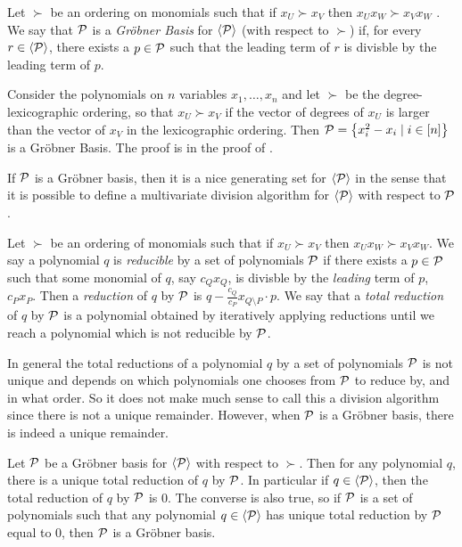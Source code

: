 \begin{definition}\label{def:grobner}
    Let $\succ$ be an ordering on monomials such that if $x_U \succ x_V$ then $x_Ux_W \succ x_Vx_W$ . We say that $\mathcal P$ is a \emph{Gr\"obner Basis} for $\langle \mathcal P \rangle$ (with respect to $\succ$) if, for every $r \in \langle \mathcal P \rangle$, there exists a $p \in \mathcal P$ such that the leading term of $r$ is divisble by the leading term of $p$.
\end{definition}
\begin{example}\label{ex:grobner}
Consider the polynomials on $n$ variables $x_1,\dots,x_n$ and let $\succ$ be the degree-lexicographic ordering, so that $x_U \succ x_V$ if the vector of degrees of $x_U$ is larger than the vector of $x_V$ in the lexicographic ordering. Then $\mathcal P = \left\{x_i^2 - x_i \mid i \in [n]\right\}$ is a Gr\"obner Basis. The proof is in the proof of .
\end{example}
If $\mathcal P$ is a Gr\"obner basis, then it is a nice generating set for $\langle \mathcal P \rangle$ in the sense that it is possible to define a multivariate division algorithm for $\langle \mathcal P \rangle$ with respect to $\mathcal P$.
\begin{definition}
Let $\succ$ be an ordering of monomials such that if $x_U \succ x_V$ then $x_Ux_W \succ x_Vx_W$. We say a polynomial $q$ is \emph{reducible} by a set of polynomials $\mathcal P$ if there exists a $p \in \mathcal P$ such that some monomial of $q$, say $c_Qx_Q$, is divisble by the \emph{leading} term of $p$, $c_Px_P$. Then a \emph{reduction} of $q$ by $\mathcal P$ is $q - \frac{c_Q}{c_P}x_{Q \setminus P} \cdot p$. We say that a \emph{total reduction} of $q$ by $\mathcal P$ is a polynomial obtained by iteratively applying reductions until we reach a polynomial which is not reducible by $\mathcal P$.
\end{definition}
In general the total reductions of a polynomial $q$ by a set of polynomials $\mathcal P$ is not unique and depends on which polynomials one chooses from $\mathcal P$ to reduce by, and in what order. So it does not make much sense to call this a division algorithm since there is not a unique remainder. However, when $\mathcal P$ is a Gr\"obner basis, there is indeed a unique remainder.
\begin{proposition}\label{prop:grobner-unique}
Let $\mathcal P$ be a Gr\"obner basis for $\langle \mathcal P \rangle$ with respect to $\succ$. Then for any polynomial $q$, there is a unique total reduction of $q$ by $\mathcal P$. In particular if $q \in \langle \mathcal P \rangle$, then the total reduction of $q$ by $\mathcal P$ is $0$. The converse is also true, so if $\mathcal P$ is a set of polynomials such that any polynomial $q \in \langle \mathcal P \rangle$ has unique total reduction by $\mathcal P$ equal to $0$, then $\mathcal P$ is a Gr\"obner basis.
\end{proposition}
